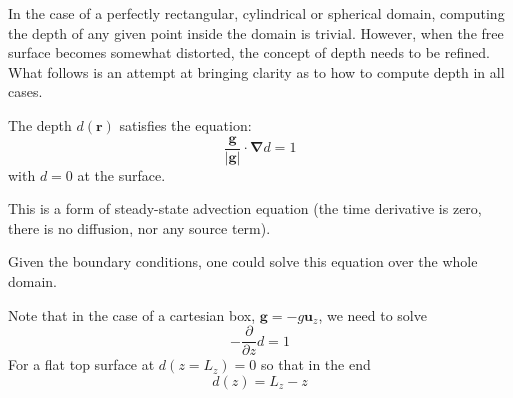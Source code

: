 In the case of a perfectly rectangular, cylindrical or spherical domain, 
computing the depth of any given point inside the domain is trivial. 
However, when the free surface becomes somewhat distorted, the concept of 
depth needs to be refined. What follows is an attempt at bringing clarity
as to how to compute depth in all cases.

The depth $d({\bm r})$ satisfies the equation:
\[
\frac{{\bm g}}{|{\bm g}|} \cdot {\bm \nabla} d = 1
\]
with $d=0$ at the surface.

This is a form of steady-state advection equation (the time derivative is zero, 
there is no diffusion, nor any source term).

Given the boundary conditions, one could solve this equation 
over the whole domain. 

Note that in the case of a cartesian box, ${\bm g}=-g {\bm u}_z$,
we need to solve 
\[
- \frac{\partial}{\partial z} d = 1
\]
For a flat top surface at $d(z=L_z)=0$ so that in the end
\[
d(z)=L_z-z
\]

